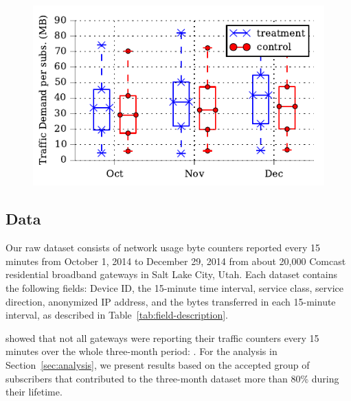 
\begin{figure}[t]
\centering
\includegraphics[width=0.55\linewidth]{figures/boxplot_monthly_avg_demand_downlink.pdf}
  \caption{\label{fig:traffic-load}}
\end{figure}
\subsection{Data}

Our raw dataset consists of network usage byte counters reported every 15
minutes from October 1, 2014 to December 29, 2014 from about 20,000
Comcast residential broadband gateways in Salt Lake City, Utah. Each
dataset contains the following fields: Device ID, the 15-minute time interval,
service class, service direction, anonymized IP address, and the bytes
transferred in each 15-minute interval, as described in
Table~\ref{tab:field-description}.

 showed that not all gateways were
reporting their traffic counters every 15 minutes over the whole three-month
period: .
For the analysis in Section~\ref{sec:analysis}, we present results based on the
accepted group of subscribers that contributed to the three-month dataset
more than 80\% during their lifetime. 

